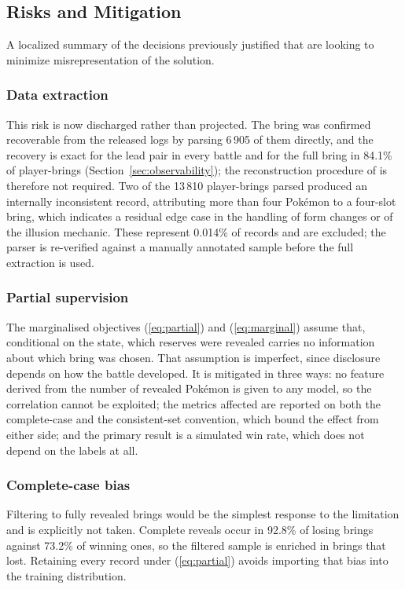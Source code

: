 \documentclass[conference]{IEEEtran}
\begin{document}
\subsection{Risks and Mitigation}
A localized summary of the decisions previously justified that are looking to minimize misrepresentation of the solution.

\subsubsection{Data extraction} This risk is now discharged rather than
projected. The bring was confirmed recoverable from the released logs by
parsing 6\,905 of them directly, and the recovery is exact for the lead pair in
every battle and for the full bring in 84.1\% of player-brings
(Section~\ref{sec:observability}); the reconstruction procedure of
\cite{grigsby2025} is therefore not required. Two of the 13\,810 player-brings
parsed produced an internally inconsistent record, attributing more than four
Pok\'emon to a four-slot bring, which indicates a residual edge case in the
handling of form changes or of the illusion mechanic. These represent 0.014\%
of records and are excluded; the parser is re-verified against a manually
annotated sample before the full extraction is used.

\subsubsection{Partial supervision} The marginalised objectives
(\ref{eq:partial}) and (\ref{eq:marginal}) assume that, conditional on the
state, which reserves were revealed carries no information about which bring
was chosen. That assumption is imperfect, since disclosure depends on how the
battle developed. It is mitigated in three ways: no feature derived from the
number of revealed Pok\'emon is given to any model, so the correlation cannot
be exploited; the metrics affected are reported on both the complete-case and
the consistent-set convention, which bound the effect from either side; and the
primary result is a simulated win rate, which does not depend on the labels at
all.

\subsubsection{Complete-case bias} Filtering to fully revealed brings would be
the simplest response to the limitation and is explicitly not taken. Complete
reveals occur in 92.8\% of losing brings against 73.2\% of winning ones, so the
filtered sample is enriched in brings that lost. Retaining every record under
(\ref{eq:partial}) avoids importing that bias into the training distribution.
\end{document}
